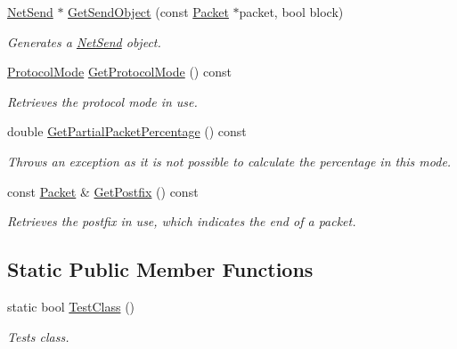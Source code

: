 \begin{DoxyCompactItemize}
\hyperlink{class_net_send}{NetSend} $\ast$ \hyperlink{class_net_mode_tcp_postfix_af283745349e833f6c053203036c99c7d}{GetSendObject} (const \hyperlink{class_packet}{Packet} $\ast$packet, bool block)
\begin{DoxyCompactList}\small\item\em Generates a \hyperlink{class_net_send}{NetSend} object. \item\end{DoxyCompactList}\item 
\hyperlink{class_net_mode_a43cfa55ee6a4db66a8d7d6c27f766964}{ProtocolMode} \hyperlink{class_net_mode_tcp_postfix_aa0c16b044df85608508a33a8b224f16c}{GetProtocolMode} () const 
\begin{DoxyCompactList}\small\item\em Retrieves the protocol mode in use. \item\end{DoxyCompactList}\item 
double \hyperlink{class_net_mode_tcp_postfix_ade09c6d671fa6078accae5196e6c95fe}{GetPartialPacketPercentage} () const 
\begin{DoxyCompactList}\small\item\em Throws an exception as it is not possible to calculate the percentage in this mode. \item\end{DoxyCompactList}\item 
const \hyperlink{class_packet}{Packet} \& \hyperlink{class_net_mode_tcp_postfix_a38f06106e685cece80bb8439be657f75}{GetPostfix} () const 
\begin{DoxyCompactList}\small\item\em Retrieves the postfix in use, which indicates the end of a packet. \item\end{DoxyCompactList}\end{DoxyCompactItemize}
\subsection*{Static Public Member Functions}
\begin{DoxyCompactItemize}
\item 
static bool \hyperlink{class_net_mode_tcp_postfix_a53d84feec3968804317e581529f192c6}{TestClass} ()
\begin{DoxyCompactList}\small\item\em Tests class. \item\end{DoxyCompactList}\end{DoxyCompactItemize}
